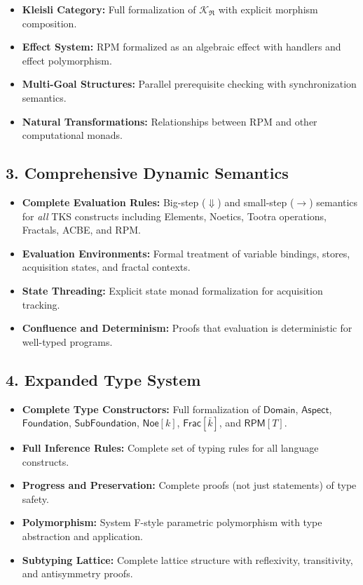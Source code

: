\documentclass[11pt,twoside,openright]{book}
\theoremstyle{definition}
\theoremstyle{plain}
\theoremstyle{remark}
\newcommand{\RPM}{\mathfrak{R}}
\newcommand{\smallstep}{\to}
\newcommand{\bigstep}{\Downarrow}
\newcommand{\Kleisli}{\mathcal{K}}
\begin{document}
\begin{itemize}
  \item \textbf{Kleisli Category:} Full formalization of $\Kleisli_\RPM$ with explicit morphism composition.
  \item \textbf{Effect System:} RPM formalized as an algebraic effect with handlers and effect polymorphism.
  \item \textbf{Multi-Goal Structures:} Parallel prerequisite checking with synchronization semantics.
  \item \textbf{Natural Transformations:} Relationships between RPM and other computational monads.
\end{itemize}

\subsection*{3. Comprehensive Dynamic Semantics}

\begin{itemize}
  \item \textbf{Complete Evaluation Rules:} Big-step ($\bigstep$) and small-step ($\smallstep$) semantics for \emph{all} TKS constructs including Elements, Noetics, Tootra operations, Fractals, ACBE, and RPM.
  \item \textbf{Evaluation Environments:} Formal treatment of variable bindings, stores, acquisition states, and fractal contexts.
  \item \textbf{State Threading:} Explicit state monad formalization for acquisition tracking.
  \item \textbf{Confluence and Determinism:} Proofs that evaluation is deterministic for well-typed programs.
\end{itemize}

\subsection*{4. Expanded Type System}

\begin{itemize}
  \item \textbf{Complete Type Constructors:} Full formalization of $\mathsf{Domain}$, $\mathsf{Aspect}$, $\mathsf{Foundation}$, $\mathsf{SubFoundation}$, $\mathsf{Noe}[k]$, $\mathsf{Frac}[\bar{k}]$, and $\mathsf{RPM}[T]$.
  \item \textbf{Full Inference Rules:} Complete set of typing rules for all language constructs.
  \item \textbf{Progress and Preservation:} Complete proofs (not just statements) of type safety.
  \item \textbf{Polymorphism:} System F-style parametric polymorphism with type abstraction and application.
  \item \textbf{Subtyping Lattice:} Complete lattice structure with reflexivity, transitivity, and antisymmetry proofs.
\end{itemize}
\end{document}
